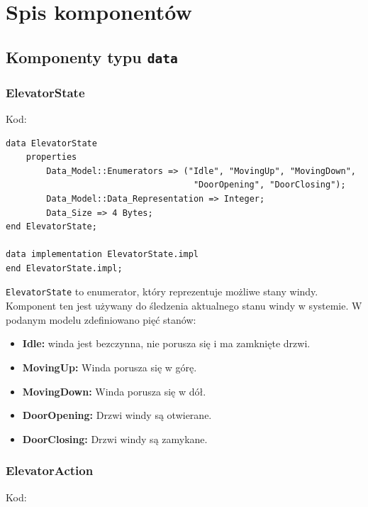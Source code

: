 \documentclass{article}
\begin{document}
\section{Spis komponentów}

\subsection{Komponenty typu \texttt{data}}

\subsubsection{ElevatorState}

Kod:

    \begin{lstlisting}[basicstyle=\ttfamily, keywordstyle=\bfseries]
data ElevatorState
    properties
        Data_Model::Enumerators => ("Idle", "MovingUp", "MovingDown",
                                     "DoorOpening", "DoorClosing");
        Data_Model::Data_Representation => Integer;
        Data_Size => 4 Bytes;
end ElevatorState;

data implementation ElevatorState.impl
end ElevatorState.impl;
    \end{lstlisting}

    \texttt{ElevatorState} to enumerator, który reprezentuje możliwe stany windy. Komponent ten jest używany do śledzenia aktualnego stanu windy w systemie. W podanym modelu zdefiniowano pięć stanów:

    \begin{itemize}
        \item \textbf{Idle:} winda jest bezczynna, nie porusza się i ma zamknięte drzwi.
        \item \textbf{MovingUp:} Winda porusza się w górę.
        \item \textbf{MovingDown:} Winda porusza się w dół.
        \item \textbf{DoorOpening:} Drzwi windy są otwierane.
        \item \textbf{DoorClosing:} Drzwi windy są zamykane.
    \end{itemize}

    \newpage

    \subsubsection{ElevatorAction}

Kod:
\end{document}
